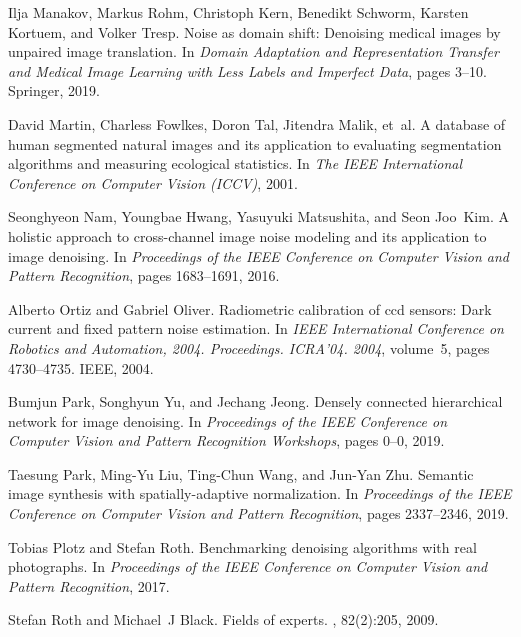 \documentclass[10pt,twocolumn,letterpaper]{article}
\begin{document}
{\begin{thebibliography}{10}
	Ilja Manakov, Markus Rohm, Christoph Kern, Benedikt Schworm, Karsten Kortuem,
	and Volker Tresp.
	\newblock Noise as domain shift: Denoising medical images by unpaired image
	translation.
	\newblock In {\em Domain Adaptation and Representation Transfer and Medical
		Image Learning with Less Labels and Imperfect Data}, pages 3--10. Springer,
	2019.
	
	David Martin, Charless Fowlkes, Doron Tal, Jitendra Malik, et~al.
	\newblock A database of human segmented natural images and its application to
	evaluating segmentation algorithms and measuring ecological statistics.
	\newblock In {\em The IEEE International Conference on Computer Vision (ICCV)},
	2001.
	
	Seonghyeon Nam, Youngbae Hwang, Yasuyuki Matsushita, and Seon Joo~Kim.
	\newblock A holistic approach to cross-channel image noise modeling and its
	application to image denoising.
	\newblock In {\em Proceedings of the IEEE Conference on Computer Vision and
		Pattern Recognition}, pages 1683--1691, 2016.
	
	Alberto Ortiz and Gabriel Oliver.
	\newblock Radiometric calibration of ccd sensors: Dark current and fixed
	pattern noise estimation.
	\newblock In {\em IEEE International Conference on Robotics and Automation,
		2004. Proceedings. ICRA'04. 2004}, volume~5, pages 4730--4735. IEEE, 2004.
	
	Bumjun Park, Songhyun Yu, and Jechang Jeong.
	\newblock Densely connected hierarchical network for image denoising.
	\newblock In {\em Proceedings of the IEEE Conference on Computer Vision and
		Pattern Recognition Workshops}, pages 0--0, 2019.
	
	Taesung Park, Ming-Yu Liu, Ting-Chun Wang, and Jun-Yan Zhu.
	\newblock Semantic image synthesis with spatially-adaptive normalization.
	\newblock In {\em Proceedings of the IEEE Conference on Computer Vision and
		Pattern Recognition}, pages 2337--2346, 2019.
	
	Tobias Plotz and Stefan Roth.
	\newblock Benchmarking denoising algorithms with real photographs.
	\newblock In {\em Proceedings of the IEEE Conference on Computer Vision and
		Pattern Recognition}, 2017.
	
	Stefan Roth and Michael~J Black.
	\newblock Fields of experts.
	, 82(2):205, 2009.
	

\end{thebibliography}}
\end{document}
